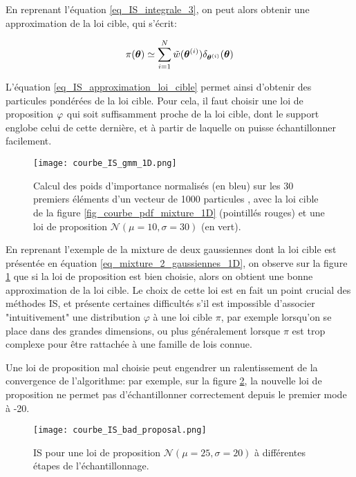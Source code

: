  En reprenant l'équation \eqref{eq_IS_integrale_3}, on peut alors obtenir une approximation de la loi cible, qui s'écrit:
 
 \begin{equation}
 \pi({\bm{\theta}}) \simeq \sum\limits_{i=1}^N {\tilde{w}}({\bm{\theta}}^{(i)})\delta_{{\bm{\theta}}^{(i)}}({\bm{\theta}})
 \label{eq_IS_approximation_loi_cible}
 \end{equation}

L'équation \eqref{eq_IS_approximation_loi_cible} permet ainsi d'obtenir des particules pondérées de la loi cible. Pour cela, il faut choisir une loi de proposition ${\varphi}$ qui soit suffisamment proche de la loi cible, dont le support englobe celui de cette dernière, et à partir de laquelle on puisse échantillonner facilement. \\

\begin{figure}[h!]
	\centering
	\texttt{[image: courbe\_IS\_gmm\_1D.png]}
	\caption{Calcul des poids d'importance normalisés  (en bleu) sur les 30 premiers éléments d'un vecteur de 1000 particules , avec la loi cible de la figure \ref{fig_courbe_pdf_mixture_1D} (pointillés rouges) et une loi de proposition $\mathcal{N}(\mu = 10, \sigma = 30)$ (en vert).  }
	\label{fig_IS_gmm_1D}
\end{figure}

En reprenant l'exemple de la mixture de deux gaussiennes {dont la loi cible est présentée en équation \eqref{eq_mixture_2_gaussiennes_1D}}, on observe sur la figure \ref{fig_IS_gmm_1D} que si la loi de proposition est bien choisie, alors on obtient une bonne approximation de la loi cible. Le choix de cette loi est en fait un point crucial des méthodes IS, et présente certaines difficultés s'il est impossible d'associer "intuitivement" une distribution $\varphi$ à une loi cible $\pi$, par exemple lorsqu'on se place dans des grandes dimensions, ou plus généralement lorsque $\pi$ est trop complexe pour être rattachée à une famille de lois connue. 

{Une loi de proposition mal choisie peut engendrer un ralentissement de la convergence de l'algorithme: par exemple, }sur la figure \ref{courbe_IS_bad_proposal}, la nouvelle loi de proposition ne permet pas d'échantillonner correctement depuis le premier mode à -20.

\begin{figure}[h!]
	\centering
	\texttt{[image: courbe\_IS\_bad\_proposal.png]}
	\caption{IS pour une loi de proposition $\mathcal{N}(\mu=25, \sigma=20)$ à différentes étapes de l'échantillonnage.}
	\label{courbe_IS_bad_proposal}
\end{figure}


